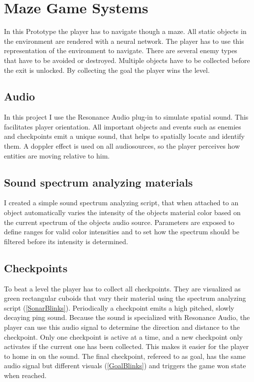 
\chapter{Maze Game Systems}\label{MazeGameSystems}
 In this Prototype the player has to navigate though a maze. All static objects in the environment are rendered with a neural network. The player has to use this representation of the environment to navigate. There are several enemy types that have to be avoided or destroyed. Multiple objects have to be collected before the exit is unlocked. By collecting the goal the player wins the level.

\section{Audio}
In this project I use the Resonance Audio plug-in to simulate spatial sound. This facilitates player orientation. All important objects and events such as enemies and checkpoints emit a unique sound, that helps to spatially locate and identify them. A doppler effect is used on all audiosources, so the player perceives how entities are moving relative to him.


\section{Sound spectrum analyzing materials}
I created a simple sound spectrum analyzing script, that when attached to an object automatically varies the intensity of the objects material color based on the current spectrum of the objects audio source. Parameters are exposed to define ranges for valid color intensities and to set how the spectrum should be filtered before its intensity is determined.


\section{Checkpoints}
To beat a level the player has to collect all checkpoints. They are visualized as green rectangular cuboids that vary their material using the spectrum analyzing script (\cref{SonarBlinks}). Periodically a checkpoint emits a high pitched, slowly decaying ping sound. Because the sound is specialized with Resonance Audio, the player can use this audio signal to determine the direction and distance to the checkpoint. Only one checkpoint is active at a time, and a new checkpoint only activates if the current one has been collected. This makes it easier for the player to home in on the sound. The final checkpoint, refereed to as goal, has the same audio signal but different visuals (\cref{GoalBlinks}) and triggers the game won state when reached.

